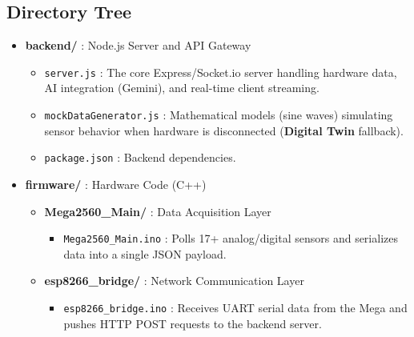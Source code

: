 \documentclass[12pt,a4paper]{article}
\newcommand{\keyword}[1]{\textcolor{keywordcolor}{\textbf{#1}}}
\newcommand{\codeinline}[1]{\texttt{\small #1}}
\begin{document}
\vspace{0.5cm}

\subsection*{Directory Tree}

\begin{itemize}[label=\textcolor{foldercolor}{\textbf{/}}]
    \item \textbf{\textcolor{foldercolor}{backend/}} : Node.js Server and API Gateway
    \begin{itemize}[label=--]
        \item \textcolor{filecolor}{\codeinline{server.js}} : The core Express/Socket.io server handling hardware data, AI integration (Gemini), and real-time client streaming.
        \item \textcolor{filecolor}{\codeinline{mockDataGenerator.js}} : Mathematical models (sine waves) simulating sensor behavior when hardware is disconnected (\keyword{Digital Twin} fallback).
        \item \textcolor{filecolor}{\codeinline{package.json}} : Backend dependencies.
    \end{itemize}

    \item \textbf{\textcolor{foldercolor}{firmware/}} : Hardware Code (C++)
    \begin{itemize}[label=--]
        \item \textbf{\textcolor{foldercolor}{Mega2560\_Main/}} : Data Acquisition Layer
        \begin{itemize}[label=-]
            \item \textcolor{filecolor}{\codeinline{Mega2560\_Main.ino}} : Polls 17+ analog/digital sensors and serializes data into a single JSON payload.
        \end{itemize}
        \item \textbf{\textcolor{foldercolor}{esp8266\_bridge/}} : Network Communication Layer
        \begin{itemize}[label=-]
            \item \textcolor{filecolor}{\codeinline{esp8266\_bridge.ino}} : Receives UART serial data from the Mega and pushes HTTP POST requests to the backend server.
        \end{itemize}
    \end{itemize}


\end{itemize}
\end{document}
